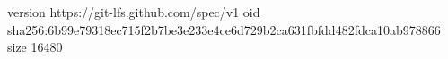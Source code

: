 version https://git-lfs.github.com/spec/v1
oid sha256:6b99e79318ec715f2b7be3e233e4ce6d729b2ca631fbfdd482fdca10ab978866
size 16480
